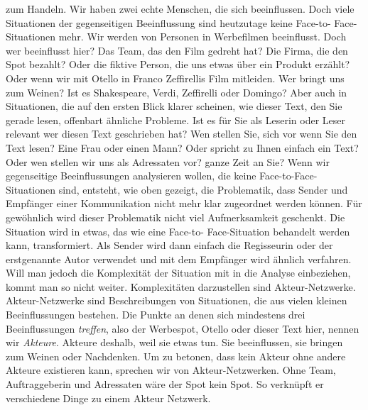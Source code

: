 zum Handeln.    Wir haben zwei echte Menschen, die sich beeinflussen.   Doch
viele Situationen der gegenseitigen Beeinflussung sind heutzutage keine Face-to-
Face-Situationen mehr.   Wir werden von Personen in Werbefilmen beeinflusst.
Doch wer beeinflusst hier? Das Team, das den Film gedreht hat? Die Firma, die
den Spot bezahlt? Oder die fiktive Person, die uns etwas über ein Produkt
erzählt?   Oder wenn wir mit Otello in Franco Zeffirellis Film
 mitleiden. Wer bringt uns zum Weinen? Ist es
Shakespeare, Verdi, Zeffirelli oder Domingo?   Aber auch in Situationen, die auf
den ersten Blick klarer scheinen, wie dieser Text, den Sie gerade lesen,
offenbart ähnliche Probleme.   Ist es für Sie als Leserin oder Leser relevant
wer diesen Text geschrieben hat? Wen stellen Sie, sich vor wenn Sie den Text
lesen? Eine Frau oder einen Mann? Oder spricht zu Ihnen einfach ein Text?   Oder
wen stellen wir uns als Adressaten vor? %
ganze Zeit an Sie?   Wenn wir gegenseitige Beeinflussungen analysieren wollen,
die keine Face-to-Face-Situationen sind, entsteht, wie oben gezeigt, die
Problematik, dass Sender und Empfänger einer Kommunikation nicht mehr klar
zugeordnet werden können. Für gewöhnlich wird dieser Problematik nicht viel
Aufmerksamkeit geschenkt. Die Situation wird in etwas, das wie eine Face-to-
Face-Situation behandelt werden kann, transformiert. Als Sender wird dann
einfach die Regisseurin oder der erstgenannte Autor verwendet und mit dem
Empfänger wird ähnlich verfahren.   Will man jedoch die Komplexität der
Situation mit in die Analyse einbeziehen, kommt man so nicht weiter.
\parencite[252\psq]{Johnson2006}    %
Komplexitäten darzustellen sind Akteur-Netzwerke. Akteur-Netzwerke sind
Beschreibungen von Situationen, die aus vielen kleinen Beeinflussungen bestehen.
Die Punkte an denen sich mindestens drei Beeinflussungen \emph{treffen}, also
der Werbespot, Otello oder dieser Text hier, nennen wir \emph{Akteure}.
Akteure deshalb, weil sie etwas tun. Sie beeinflussen, sie bringen zum Weinen
oder Nachdenken.   Um zu betonen, dass kein Akteur ohne andere Akteure
existieren kann, sprechen wir von Akteur-Netzwerken. \parencite[82]{Latour2010}
Ohne Team, Auftraggeberin und Adressaten wäre der Spot kein Spot. So verknüpft
er verschiedene Dinge zu einem Akteur Netzwerk.



